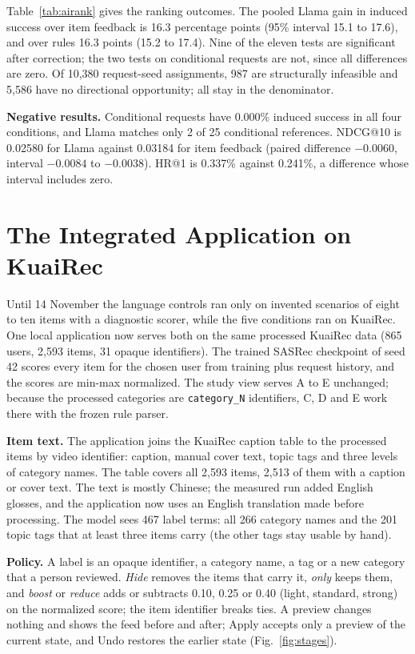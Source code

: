 \documentclass[conference]{IEEEtran}
\begin{document}
Table~\ref{tab:airank} gives the ranking outcomes. The pooled Llama gain in induced success over item feedback is 16.3 percentage points (95\% interval 15.1 to 17.6), and over rules 16.3 points (15.2 to 17.4). Nine of the eleven tests are significant after correction; the two tests on conditional requests are not, since all differences are zero. Of 10,380 request-seed assignments, 987 are structurally infeasible and 5,586 have no directional opportunity; all stay in the denominator.

\textbf{Negative results.} Conditional requests have 0.000\% induced success in all four conditions, and Llama matches only 2 of 25 conditional references. NDCG@10 is 0.02580 for Llama against 0.03184 for item feedback (paired difference $-0.0060$, interval $-0.0084$ to $-0.0038$). HR@1 is 0.337\% against 0.241\%, a difference whose interval includes zero.

\section{The Integrated Application on KuaiRec}\label{sec:app}
Until 14 November the language controls ran only on invented scenarios of eight to ten items with a diagnostic scorer, while the five conditions ran on KuaiRec. One local application now serves both on the same processed KuaiRec data (865 users, 2,593 items, 31 opaque identifiers). The trained SASRec checkpoint of seed 42 scores every item for the chosen user from training plus request history, and the scores are min-max normalized. The study view serves A to E unchanged; because the processed categories are \texttt{category\_N} identifiers, C, D and E work there with the frozen rule parser.

\textbf{Item text.} The application joins the KuaiRec caption table to the processed items by video identifier: caption, manual cover text, topic tags and three levels of category names. The table covers all 2,593 items, 2,513 of them with a caption or cover text. The text is mostly Chinese; the measured run added English glosses, and the application now uses an English translation made before processing. The model sees 467 label terms: all 266 category names and the 201 topic tags that at least three items carry (the other tags stay usable by hand).

\textbf{Policy.} A label is an opaque identifier, a category name, a tag or a new category that a person reviewed. \emph{Hide} removes the items that carry it, \emph{only} keeps them, and \emph{boost} or \emph{reduce} adds or subtracts 0.10, 0.25 or 0.40 (light, standard, strong) on the normalized score; the item identifier breaks ties. A preview changes nothing and shows the feed before and after; Apply accepts only a preview of the current state, and Undo restores the earlier state (Fig.~\ref{fig:stages}).
\end{document}

